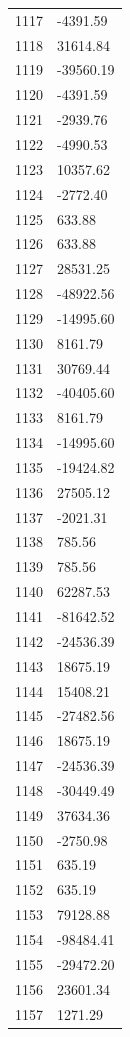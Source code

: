 \documentclass[a4paper,11pt]{article}
\begin{document}
\begin{center}
\begin{longtable}{|R{1.5cm}|R{2.6cm}|}
 1117 &     -4391.59 \\
 1118 &     31614.84 \\
 1119 &    -39560.19 \\
 1120 &     -4391.59 \\
 1121 &     -2939.76 \\
 1122 &     -4990.53 \\
 1123 &     10357.62 \\
 1124 &     -2772.40 \\
 1125 &       633.88 \\
 1126 &       633.88 \\
 1127 &     28531.25 \\
 1128 &    -48922.56 \\
 1129 &    -14995.60 \\
 1130 &      8161.79 \\
 1131 &     30769.44 \\
 1132 &    -40405.60 \\
 1133 &      8161.79 \\
 1134 &    -14995.60 \\
 1135 &    -19424.82 \\
 1136 &     27505.12 \\
 1137 &     -2021.31 \\
 1138 &       785.56 \\
 1139 &       785.56 \\
 1140 &     62287.53 \\
 1141 &    -81642.52 \\
 1142 &    -24536.39 \\
 1143 &     18675.19 \\
 1144 &     15408.21 \\
 1145 &    -27482.56 \\
 1146 &     18675.19 \\
 1147 &    -24536.39 \\
 1148 &    -30449.49 \\
 1149 &     37634.36 \\
 1150 &     -2750.98 \\
 1151 &       635.19 \\
 1152 &       635.19 \\
 1153 &     79128.88 \\
 1154 &    -98484.41 \\
 1155 &    -29472.20 \\
 1156 &     23601.34 \\
 1157 &      1271.29 \\

\end{longtable}
\end{center}
\end{document}
